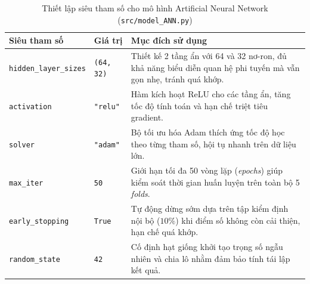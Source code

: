 \begin{table}[H]
\centering
\caption{Thiết lập siêu tham số cho mô hình Artificial Neural Network (\texttt{src/model\_ANN.py})}
\label{tab:ann_hyperparams}
\renewcommand{\arraystretch}{1.2}
\begin{tabular}{|l|l|p{8.0cm}|}
\hline
\textbf{Siêu tham số} & \textbf{Giá trị} & \textbf{Mục đích sử dụng} \\
\hline
\texttt{hidden\_layer\_sizes} & \texttt{(64, 32)} & Thiết kế 2 tầng ẩn với 64 và 32 nơ-ron, đủ khả năng biểu diễn quan hệ phi tuyến mà vẫn gọn nhẹ, tránh quá khớp. \\
\hline
\texttt{activation} & \texttt{"relu"} & Hàm kích hoạt ReLU cho các tầng ẩn, tăng tốc độ tính toán và hạn chế triệt tiêu gradient. \\
\hline
\texttt{solver} & \texttt{"adam"} & Bộ tối ưu hóa Adam thích ứng tốc độ học theo từng tham số, hội tụ nhanh trên dữ liệu lớn. \\
\hline
\texttt{max\_iter} & \texttt{50} & Giới hạn tối đa 50 vòng lặp (\textit{epochs}) giúp kiểm soát thời gian huấn luyện trên toàn bộ 5 \textit{folds}. \\
\hline
\texttt{early\_stopping} & \texttt{True} & Tự động dừng sớm dựa trên tập kiểm định nội bộ ($10\%$) khi điểm số không còn cải thiện, hạn chế quá khớp. \\
\hline
\texttt{random\_state} & \texttt{42} & Cố định hạt giống khởi tạo trọng số ngẫu nhiên và chia lô nhằm đảm bảo tính tái lập kết quả. \\
\hline
\end{tabular}
\end{table}
